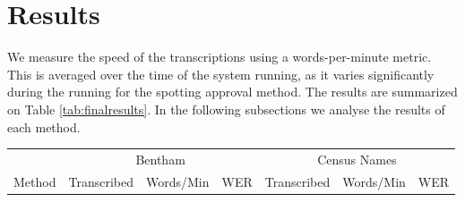 \documentclass[ms,electronic,twosidetoc,letterpaper,chaptercenter,parttop,lof,lot]{byumsphd}
\begin{document}
\section{Results}

We measure the speed of the transcriptions using a words-per-minute metric. This is averaged over the time of the system running, as it varies significantly during the running for the spotting approval method. The results are summarized on Table \ref{tab:finalresults}. In the following subsections we analyse the results of each method.

\begin{table}
\centering
\begin{tabular}{| l | c  c  c | c c c |}
  \hline
   & \multicolumn{3}{c|}{Bentham} & \multicolumn{3}{c|}{Census Names}\\
  Method & Transcribed & Words/Min & WER & Transcribed & Words/Min & WER\\
%
  
  \hline		


\end{tabular}
\end{table}
\end{document}
